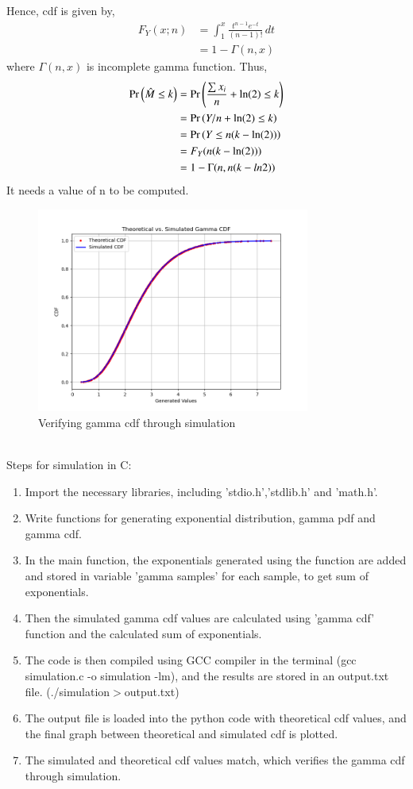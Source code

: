 \documentclass[]{article}
\theoremstyle{remark}
\begin{document}
Hence, cdf is given by,
\begin{align}
F_Y(x;n) &= \int_{1}^{x} \frac{t^{n-1}e^{-t}}{(n-1)!} \,dt \\
&= 1 - \Gamma(n,x)
\end{align}
where $\Gamma(n,x)$ is incomplete gamma function.
Thus,
\begin{align}
\Pr\left(\hat{M} \leq k\right) &= \Pr\left(\frac{\sum x_i}{n} + \ln(2) \leq k\right)\\
&= \Pr\left(Y/n + \ln(2) \leq k\right)\\
&= \Pr\left(Y \leq n(k - \ln(2))\right)\\
&= F_Y(n(k-\ln(2)))\\
&= 1 - \Gamma(n,n(k-ln2))
\end{align}
It needs a value of n to be computed.
\begin{figure}[htbp]
    \centering
    \includegraphics[width=0.8\textwidth]{2023/ST/39/figs/fig.png} 
    \caption{Verifying gamma cdf through simulation}
    \label{fig:39/2023}
\end{figure}\\
Steps for simulation in C:
\begin{enumerate}
\item Import the necessary libraries, including 'stdio.h','stdlib.h' and 'math.h'.
\item Write functions for generating exponential distribution, gamma pdf and gamma cdf.
\item In the main function, the exponentials generated using the function are added and stored in variable 'gamma samples' for each sample, to get sum of exponentials.
\item Then the simulated gamma cdf values are calculated using 'gamma cdf' function and the calculated sum of exponentials.
\item The code is then compiled using GCC compiler in the terminal (gcc simulation.c -o simulation -lm), and the results are stored in an output.txt file. (./simulation$>$output.txt)
\item The output file is loaded into the python code with theoretical cdf values, and the final graph between theoretical and simulated cdf is plotted.
\item The simulated and theoretical cdf values match, which verifies the gamma cdf through simulation.
\end{enumerate}
\end{document}

